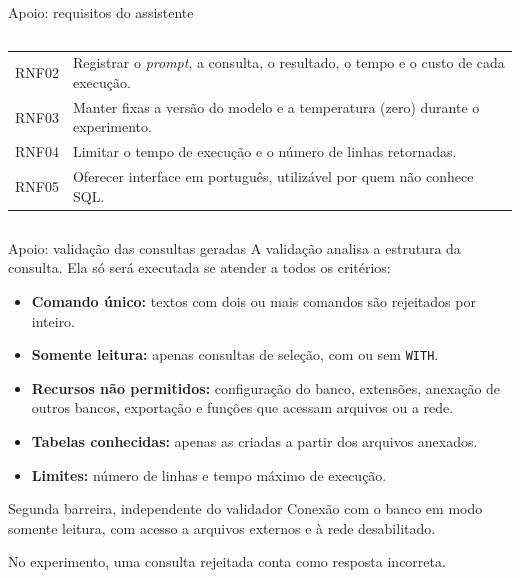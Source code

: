 \documentclass[aspectratio=169,10pt]{beamer}
\begin{document}
\begin{frame}{Apoio: requisitos do assistente}
\begin{columns}[T,onlytextwidth]
\begin{column}{0.44\textwidth}
\begin{tabular}{@{}lL{50mm}@{}}
        RNF02 & Registrar o \textit{prompt}, a consulta, o resultado, o tempo e o custo de cada execução.\\
        RNF03 & Manter fixas a versão do modelo e a temperatura (zero) durante o experimento.\\
        RNF04 & Limitar o tempo de execução e o número de linhas retornadas.\\
        RNF05 & Oferecer interface em português, utilizável por quem não conhece SQL.\\
        \bottomrule
      \end{tabular}
    \end{column}
  \end{columns}
\end{frame}

\begin{frame}{Apoio: validação das consultas geradas}
  \small
  A validação analisa a estrutura da consulta. Ela só será executada se atender a todos os critérios:
  \begin{itemize}
    \item \textbf{Comando único:} textos com dois ou mais comandos são rejeitados por inteiro.
    \item \textbf{Somente leitura:} apenas consultas de seleção, com ou sem \texttt{WITH}.
    \item \textbf{Recursos não permitidos:} configuração do banco, extensões, anexação de outros bancos,
      exportação e funções que acessam arquivos ou a rede.
    \item \textbf{Tabelas conhecidas:} apenas as criadas a partir dos arquivos anexados.
    \item \textbf{Limites:} número de linhas e tempo máximo de execução.
  \end{itemize}
  \vspace{2mm}
  \begin{block}{Segunda barreira, independente do validador}
    Conexão com o banco em modo somente leitura, com acesso a arquivos externos e à rede desabilitado.
  \end{block}
  \vspace{1mm}
  {\small No experimento, uma consulta rejeitada conta como resposta incorreta.}
\end{frame}
\end{document}
